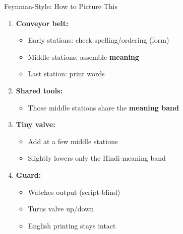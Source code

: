 \documentclass[aspectratio=169]{beamer}
\newcommand{\highlight}[1]{\textcolor{mOrange}{\textbf{#1}}}
\newcommand{\keyword}[1]{\textcolor{mBlue}{\textbf{#1}}}
\begin{document}
\begin{frame}{Feynman-Style: How to Picture This}

\begin{enumerate}
  \item \textbf{Conveyor belt:}
  \begin{itemize}
    \item Early stations: check spelling/ordering (form)
    \item Middle stations: assemble \highlight{meaning}
    \item Last station: print words
  \end{itemize}

  \vspace{2mm}

  \item \textbf{Shared tools:}
  \begin{itemize}
    \item Those middle stations share the \keyword{meaning band}
  \end{itemize}

  \vspace{2mm}

  \item \textbf{Tiny valve:}
  \begin{itemize}
    \item Add at a few middle stations
    \item Slightly lowers only the Hindi-meaning band
  \end{itemize}

  \vspace{2mm}

  \item \textbf{Guard:}
  \begin{itemize}
    \item Watches output (script-blind)
    \item Turns valve up/down
    \item English printing stays intact
  \end{itemize}
\end{enumerate}

\end{frame}
\end{document}
